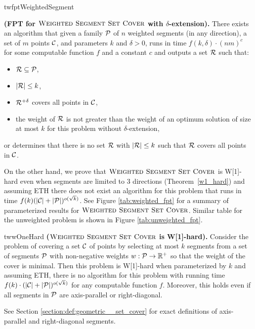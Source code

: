 \begin{restatable}{tw}{fptWeightedSegment}{
	\label{fpt_weighted_segment}
	\textbf{(FPT for $\textsc{Weighted Segment Set Cover}$ with $\delta$-extension).}
	There exists an algorithm that given a family $\mathcal{P}$ of
	$n$ weighted segments (in any direction),
	a set of $m$ points $\mathcal{C}$, and parameters $k$ and $\delta > 0$,
	runs in time $f(k, \delta) \cdot (nm)^c$ for some computable function $f$ and a constant $c$ and
	outputs a set $\mathcal{R}$ such that:
	\begin{itemize}
	\item $\mathcal{R} \subseteq \mathcal{P}$,
	\item $|\mathcal{R}| \le k$,
	\item $\mathcal{R}^{+\delta}$ covers all points in $\mathcal{C}$,
	\item the weight of $\mathcal{R}$ is not greater than the weight
	of an optimum solution of size at most $k$
	for this problem without $\delta$-extension,
	\end{itemize}
	or determines that there is no set $\mathcal{R}$ with $|\mathcal{R}| \le k$
	such that $\mathcal{R}$ covers all points in $\mathcal{C}$.
}\end{restatable}

On the other hand, we prove that $\textsc{Weighted Segment Set Cover}$ 
is W[1]-hard even when segments are limited to 3 directions (Theorem~\ref{w1_hard})
and assuming ETH there does not exist an algorithm for this problem
that runs in time ${f(k)(|\mathcal{C}| + |\mathcal{P}|)^{o(\sqrt{k})}}$.
See Figure \ref{tab:weighted_fpt} for a summary of parameterized
results for $\textsc{Weighted Segment Set Cover}$.
Similar table for the unweighted problem
is shown in Figure \ref{tab:unweighted_fpt}.

\begin{restatable}{tw}{wOneHard}
\label{w1_hard}
	\textbf{($\textsc{Weighted Segment Set Cover}$ is W[1]-hard).}
	Consider the problem of covering a set $\mathcal{C}$ of points
	by selecting at most $k$ segments
	from a set of segments $\mathcal{P}$ 
	with non-negative weights $w : \mathcal{P} \rightarrow \mathbb{R^+}$
	so that the weight of the cover is minimal.
	Then this problem is W[1]-hard when parameterized by $k$ and
	assuming ETH, there is no algorithm for this
	problem with running time
	$f(k)\cdot(|\mathcal{C}| + |\mathcal{P}|)^{o(\sqrt{k})}$
	for any computable function $f$.
	Moreover, this holds even if all segments in $\mathcal{P}$
	are axis-parallel or right-diagonal.
\end{restatable}

See Section \ref{section:def:geometric__set_cover}
for exact definitions of axis-parallel and right-diagonal segments.

